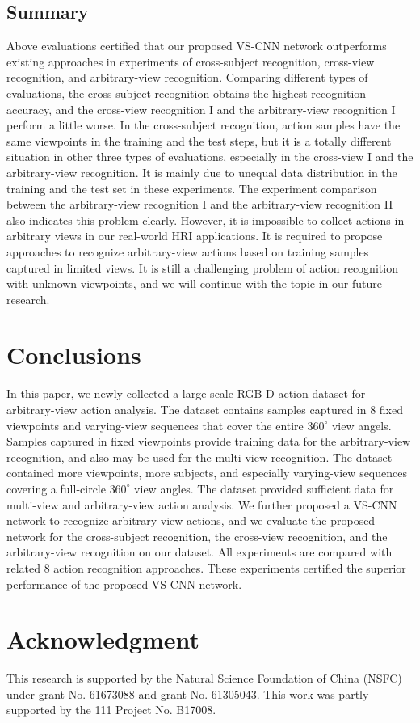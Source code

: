 \documentclass[journal]{IEEEtran}
\begin{document}
\subsection{Summary}
Above evaluations certified that our proposed VS-CNN network outperforms existing approaches in experiments of cross-subject recognition, cross-view recognition, and arbitrary-view recognition.
Comparing different types of evaluations, the cross-subject recognition obtains the highest recognition accuracy, and the cross-view recognition I and the arbitrary-view recognition I perform a little worse. In the cross-subject recognition, action samples have the same viewpoints in the training and the test steps, but it is a totally different situation in other three types of evaluations, especially in the cross-view I and the arbitrary-view recognition. It is mainly due to unequal data distribution in the training and the test set in these experiments. The experiment comparison between the arbitrary-view recognition I and the arbitrary-view recognition II also indicates this problem clearly. However, it is impossible to collect actions in arbitrary views in our real-world HRI applications. It is required to propose approaches to recognize arbitrary-view actions based on training samples captured in limited views.
It is still a challenging problem of action recognition with unknown viewpoints, and we will continue with the topic in our future research.

\section{Conclusions}
\label{sec:conclu}
In this paper, we newly collected a large-scale RGB-D action dataset for arbitrary-view action analysis. The dataset contains samples captured in 8 fixed viewpoints and varying-view sequences that cover the entire $360^\circ$ view angels. Samples captured in fixed viewpoints provide training data for the arbitrary-view recognition, and also may be used for the multi-view recognition. The dataset contained more viewpoints, more subjects, and especially varying-view sequences covering a full-circle $360^\circ$ view angles.
The dataset provided sufficient data for multi-view and arbitrary-view action analysis. We further proposed a VS-CNN network to recognize arbitrary-view actions, and we evaluate the proposed network for the cross-subject recognition, the cross-view recognition, and the arbitrary-view recognition on our dataset. All experiments are compared with related 8 action recognition approaches. These experiments certified the superior performance of the proposed VS-CNN network.

\section*{Acknowledgment}
This research is supported by the Natural Science Foundation of China (NSFC) under grant No. 61673088 and grant No. 61305043.
This work was partly supported by the 111 Project No. B17008.
\ifCLASSOPTIONcaptionsoff
  \newpage
\fi





\end{document}
